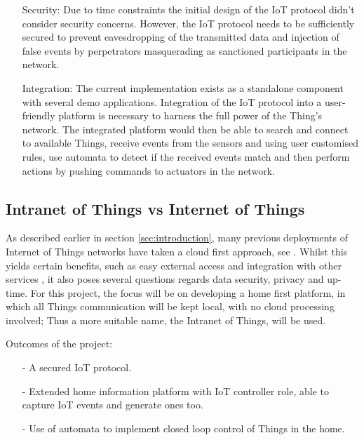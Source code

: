 \documentclass{mprop}
\begin{document}
\begin{itemize}
    \item [Security:] Due to time constraints the initial design of the IoT protocol didn't consider security concerns. However, the IoT protocol needs to be sufficiently secured to prevent eavesdropping of the transmitted data and injection of false events by perpetrators masquerading as sanctioned participants in the network. 
    \item [Integration:] The current implementation exists as a standalone component with several demo applications. Integration of the IoT protocol into a user-friendly platform is necessary to harness the full power of the Thing's network. The integrated platform would then be able to search and connect to available Things, receive events from the sensors and using user customised rules, use automata to detect if the received events match and then perform actions by pushing commands to actuators in the network.
\end{itemize}

\subsection{Intranet of Things vs Internet of Things} %
\label{sub:intranet_of_things}

As described earlier in section \ref{sec:introduction}, many previous deployments of Internet of Things networks have taken a cloud first approach, see \cite{SmartThings, Twine}. Whilst this yields certain benefits, such as easy external access and integration with other services \cite{IFTTT, Xively}, it also poses several questions regards data security, privacy and up-time. For this project, the focus will be on developing a home first platform, in which all Things communication will be kept local, with no cloud processing involved; Thus a more suitable name, the Intranet of Things, will be used. 


Outcomes of the project:
\begin{itemize}
  \item[-] A secured IoT protocol.
  \item[-] Extended home information platform with IoT controller role, able to capture IoT events and generate ones too.
  \item[-] Use of automata to implement closed loop control of Things in the home.
\end{itemize}
\end{document}
